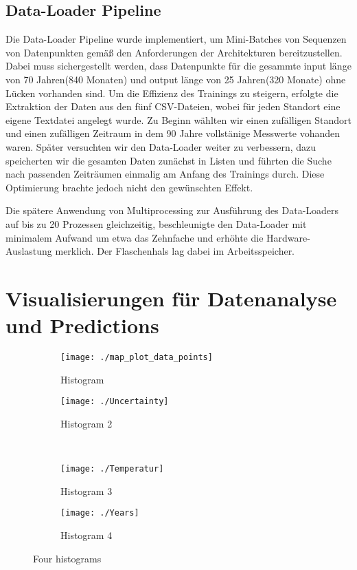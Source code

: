 \documentclass[manuscript,screen,review]{acmart}
\begin{document}
\subsection{Data-Loader Pipeline} %
Die Data-Loader Pipeline wurde implementiert, um Mini-Batches von Sequenzen von Datenpunkten gemäß den Anforderungen der Architekturen bereitzustellen. Dabei muss sichergestellt werden, dass Datenpunkte für die gesammte input länge von 70 Jahren(840 Monaten) und output länge von 25 Jahren(320 Monate) ohne Lücken vorhanden sind.
Um die Effizienz des Trainings zu steigern, erfolgte die Extraktion der Daten aus den fünf CSV-Dateien, wobei für jeden Standort eine eigene Textdatei angelegt wurde. Zu Beginn wählten wir einen zufälligen Standort und einen zufälligen Zeitraum in dem 90 Jahre vollstänige Messwerte vohanden waren.
Später versuchten wir den Data-Loader weiter zu verbessern, dazu speicherten wir die gesamten Daten zunächst in Listen und führten die Suche nach passenden Zeiträumen einmalig am Anfang des Trainings durch. Diese Optimierung brachte jedoch nicht den gewünschten Effekt.

Die spätere Anwendung von Multiprocessing zur Ausführung des Data-Loaders auf bis zu 20 Prozessen gleichzeitig, beschleunigte den Data-Loader mit minimalem Aufwand um etwa das Zehnfache und erhöhte die Hardware-Auslastung merklich. Der Flaschenhals lag dabei im Arbeitsspeicher.


\section{Visualisierungen für Datenanalyse und Predictions}

\begin{figure}[htp]
  \centering
  \begin{subfigure}{.45\textwidth}
      \centering
      \texttt{[image: ./map\_plot\_data\_points]}
      \caption{Histogram}
      \label{fig:sub1}
  \end{subfigure}%
  \begin{subfigure}{.45\textwidth}
      \centering
      \texttt{[image: ./Uncertainty]}
      \caption{Histogram 2}
      \label{fig:sub2}
  \end{subfigure}\\
  \begin{subfigure}{.45\textwidth}
      \centering
      \texttt{[image: ./Temperatur]}
      \caption{Histogram 3}
      \label{fig:sub3}
  \end{subfigure}%
  \begin{subfigure}{.45\textwidth}
      \centering
      \texttt{[image: ./Years]}
      \caption{Histogram 4}
      \label{fig:sub4}
  \end{subfigure}
  \caption{Four histograms}
  \label{fig:test}
\end{figure}
\end{document}
